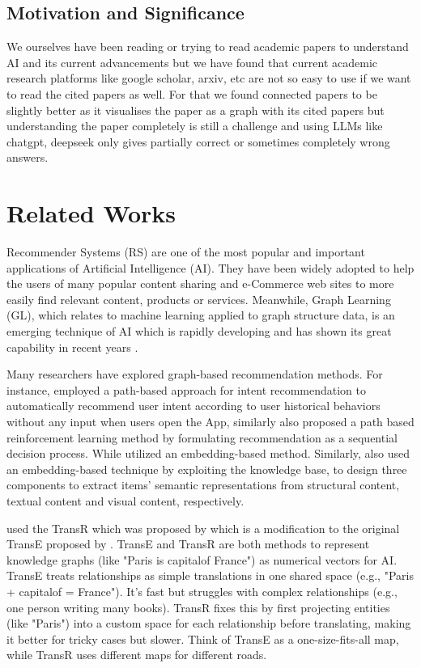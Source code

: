 \documentclass[a4paper,12pt]{article}
\begin{document}
\subsection{Motivation and Significance}
We ourselves have been reading or trying to read academic papers to understand AI
and its current advancements but we have found that current academic research platforms
like google scholar, arxiv, etc are not so easy to use if we want to read the cited
papers as well. For that we found connected papers to be slightly better as it
visualises the paper as a graph with its cited papers but understanding the paper
completely is still a challenge and using LLMs like chatgpt, deepseek only gives
partially correct or sometimes completely wrong answers.
\newpage

\section{Related Works}
Recommender Systems (RS) are one of the most popular and important applications of
Artificial Intelligence (AI). They have been widely adopted to help the users of
many popular content sharing and e-Commerce web sites to more easily find relevant
content, products or services. Meanwhile, Graph Learning (GL), which relates to
machine learning applied to graph structure data, is an emerging technique of AI
which is rapidly developing and has shown its great capability in recent years
\parencite{wang2021graphlearningbasedrecommender}.

Many researchers have explored graph-based recommendation methods. For instance,
\parencite{10.1145/3292500.3330673} employed a path-based approach for intent
recommendation to automatically recommend user intent according to user
historical behaviors without any input when users open the App,  similarly
\parencite{song2022ekarexplainablemethodknowledge} also proposed a path based
reinforcement learning method by formulating recommendation as a sequential
decision process. While \parencite{10.1145/3109859.3109889} utilized an embedding-based
method. Similarly, \parencite{10.1145/2939672.2939673} also used an embedding-based
technique by exploiting the knowledge base, to design three components to extract items'
semantic representations from structural content, textual content and visual content,
respectively.

\parencite{10.1145/2939672.2939673} used the TransR which was proposed by
\parencite{10.3233/JIFS-202177} which is a modification to the original TransE proposed
by \parencite{NIPS2013_1cecc7a7}.  TransE and TransR are both methods to represent
knowledge graphs (like "Paris is capitalof France") as numerical vectors for AI.
TransE treats relationships as simple translations in one shared space
(e.g., "Paris + capitalof = France"). It’s fast but struggles with complex
relationships (e.g., one person writing many books). TransR fixes this by first
projecting entities (like "Paris") into a custom space for each relationship before
translating, making it better for tricky cases but slower. Think of TransE as a
one-size-fits-all map, while TransR uses different maps for different roads.
\end{document}
